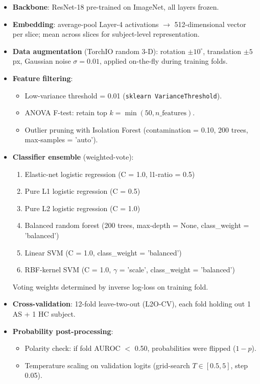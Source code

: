 \documentclass[12pt, a4paper]{article}
\begin{document}
\begin{itemize}
    \item \textbf{Backbone}: ResNet-18 pre-trained on ImageNet, all layers frozen.
    \item \textbf{Embedding}: average-pool Layer-4 activations $\rightarrow$ 512-dimensional vector per slice; mean across slices for subject-level representation.
    \item \textbf{Data augmentation} (TorchIO random 3-D): rotation \( \pm10^\circ \), translation \( \pm5 \) px, Gaussian noise \( \sigma = 0.01 \), applied on-the-fly during training folds.
    \item \textbf{Feature filtering}:
    \begin{itemize}
        \item Low-variance threshold = 0.01 (\texttt{sklearn VarianceThreshold}).
        \item ANOVA F-test: retain top \( k = \min(50, n\_\text{features}) \).
        \item Outlier pruning with Isolation Forest (contamination = 0.10, 200 trees, max-samples = 'auto').
    \end{itemize}
    \item \textbf{Classifier ensemble} (weighted-vote):
    \begin{enumerate}
        \item Elastic-net logistic regression (C = 1.0, l1-ratio = 0.5)
        \item Pure L1 logistic regression (C = 0.5)
        \item Pure L2 logistic regression (C = 1.0)
        \item Balanced random forest (200 trees, max-depth = None, class\_weight = 'balanced')
        \item Linear SVM (C = 1.0, class\_weight = 'balanced')
        \item RBF-kernel SVM (C = 1.0, \( \gamma \) = 'scale', class\_weight = 'balanced')
    \end{enumerate}
    Voting weights determined by inverse log-loss on training fold.
    \item \textbf{Cross-validation}: 12-fold leave-two-out (L2O-CV), each fold holding out 1 AS + 1 HC subject.
    \item \textbf{Probability post-processing}:
    \begin{itemize}
        \item Polarity check: if fold AUROC $<$ 0.50, probabilities were flipped (\( 1 - p \)).
        \item Temperature scaling on validation logits (grid-search \( T \in [0.5, 5] \), step 0.05).

\end{itemize}
\end{itemize}
\end{document}
